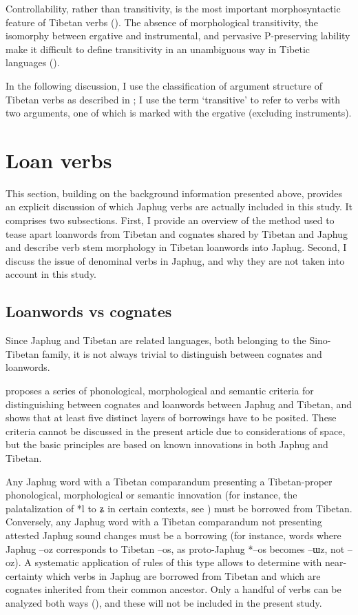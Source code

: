 \documentclass[oldfontcommands,oneside,a4paper,11pt]{article}
\newcommand{\ipa}[1]{{\phon \mbox{#1}}} %
\begin{document}
Controllability, rather than transitivity, is the most important morphosyntactic feature of Tibetan verbs (\citealt[74-5, 136]{haller04themchen}). The absence of morphological transitivity, the isomorphy between ergative and instrumental, and pervasive P-preserving lability make it difficult to define transitivity in an unambiguous way in Tibetic languages (\citealt{tournadre96erg}).

In the following discussion, I use the classification of argument structure of Tibetan verbs as described in \citet{haller04themchen}; I use the term `transitive' to refer to verbs with two arguments, one of which is marked with the ergative (excluding instruments). 


\section{Loan verbs}
This section, building on the background information presented above, provides an explicit discussion of which Japhug verbs are actually included in this study. It comprises two subsections. First, I provide an overview of the method used to tease apart loanwords from Tibetan and cognates shared by Tibetan and Japhug and describe verb stem morphology in Tibetan loanwords into Japhug. Second, I discuss the issue of denominal verbs in Japhug, and why they are not taken into account in this study. 

\subsection{Loanwords vs cognates} \label{sec:layers}
Since Japhug and Tibetan are related languages, both belonging to the Sino-Tibetan family, it is not always trivial to distinguish between cognates and loanwords. 

\citet[83-200]{jacques04these} proposes a series of phonological, morphological and semantic criteria for distinguishing between cognates and  loanwords between Japhug and Tibetan, and shows that at least five distinct layers of borrowings have to be posited. These criteria cannot be discussed in the present article due to considerations of space, but the basic principles are based on known innovations in both Japhug and Tibetan. 

Any Japhug word with a Tibetan comparandum presenting a Tibetan-proper phonological, morphological or semantic innovation (for instance, the palatalization of *l to \ipa{ʑ} in certain contexts, see \citealt{hill13laterals}) must be borrowed from Tibetan. Conversely, any Japhug word with a Tibetan comparandum not presenting attested Japhug sound changes must be a borrowing (for instance, words where Japhug \ipa{--oz} corresponds to Tibetan \ipa{--os}, as proto-Japhug *\ipa{--os} becomes \ipa{--ɯz}, not \ipa{--oz}). A systematic application of rules of this type allows to determine with near-certainty which verbs in Japhug are borrowed from Tibetan and which are cognates inherited from their common ancestor. Only a handful of verbs can be analyzed both ways (\citealt[164]{jacques04these}), and these will not be included in the present study.
\end{document}
